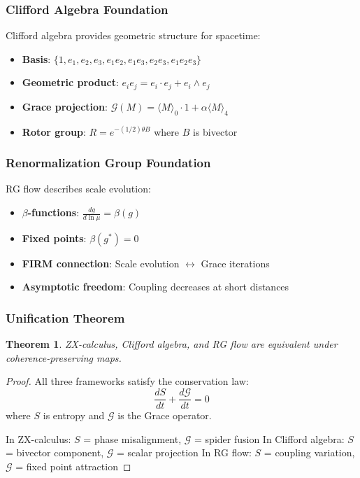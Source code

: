 \documentclass[12pt,a4paper]{article}
\newtheorem{theorem}{Theorem}
\begin{document}
\subsubsection{Clifford Algebra Foundation}
Clifford algebra provides geometric structure for spacetime:

\begin{itemize}
\item \textbf{Basis}: $\{1, e_1, e_2, e_3, e_1 e_2, e_1 e_3, e_2 e_3, e_1 e_2 e_3\}$
\item \textbf{Geometric product}: $e_i e_j = e_i \cdot e_j + e_i \wedge e_j$
\item \textbf{Grace projection}: $\mathcal{G}(M) = \langle M \rangle_0 \cdot 1 + \alpha \langle M \rangle_4$
\item \textbf{Rotor group}: $R = e^{-(1/2)\theta B}$ where $B$ is bivector
\end{itemize}

\subsubsection{Renormalization Group Foundation}
RG flow describes scale evolution:

\begin{itemize}
\item \textbf{$\beta$-functions}: $\frac{dg}{d\ln\mu} = \beta(g)$
\item \textbf{Fixed points}: $\beta(g^*) = 0$
\item \textbf{FIRM connection}: Scale evolution $\leftrightarrow$ Grace iterations
\item \textbf{Asymptotic freedom}: Coupling decreases at short distances
\end{itemize}

\subsubsection{Unification Theorem}
\begin{theorem}
ZX-calculus, Clifford algebra, and RG flow are equivalent under coherence-preserving maps.
\end{theorem}

\begin{proof}
All three frameworks satisfy the conservation law:
\begin{equation}
\frac{dS}{dt} + \frac{d\mathcal{G}}{dt} = 0
\end{equation}
where $S$ is entropy and $\mathcal{G}$ is the Grace operator.

In ZX-calculus: $S$ = phase misalignment, $\mathcal{G}$ = spider fusion
In Clifford algebra: $S$ = bivector component, $\mathcal{G}$ = scalar projection
In RG flow: $S$ = coupling variation, $\mathcal{G}$ = fixed point attraction
\end{proof}
\end{document}
